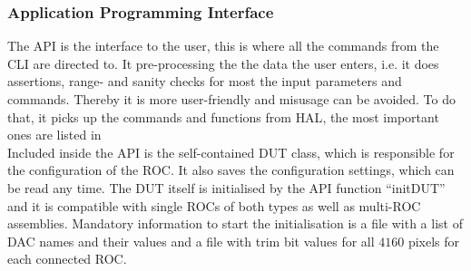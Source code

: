\documentclass[british,11pt,a4paper]{memoir}
\begin{document}
\subsubsection{Application Programming Interface}
The \ac{API} is the interface to the user, this is where all the commands from the \ac{CLI} are directed to. It pre-processing the the data the user enters, i.e. it does assertions, range- and sanity checks for most the input parameters and commands. Thereby it is more user-friendly and misusage can be avoided. To do that, it picks up the commands and functions from \ac{HAL}, the most important ones are listed in \\
Included inside the \ac{API} is the self-contained \ac{DUT} class, which is responsible for the configuration of the \ac{ROC}. It also saves the configuration settings, which can be read any time. The \ac{DUT} itself is initialised by the \ac{API} function ``initDUT'' and it is compatible with single \ac{ROC}s of both types as well as multi-\ac{ROC} assemblies. Mandatory information to start the initialisation is a file with a list of \ac{DAC} names and their values and a file with trim bit values for all $4160$ pixels for each connected \ac{ROC}.
\end{document}
